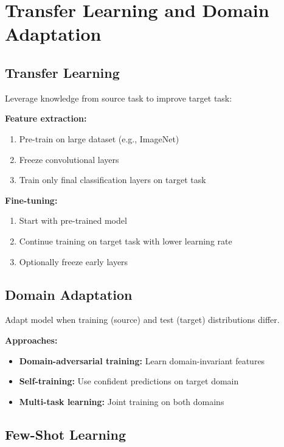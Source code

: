
\section{Transfer Learning and Domain Adaptation }
\label{sec:transfer-learning}

\subsection{Transfer Learning}

Leverage knowledge from source task to improve target task:

\textbf{Feature extraction:}
\begin{enumerate}
    \item Pre-train on large dataset (e.g., ImageNet)
    \item Freeze convolutional layers
    \item Train only final classification layers on target task
\end{enumerate}

\textbf{Fine-tuning:}
\begin{enumerate}
    \item Start with pre-trained model
    \item Continue training on target task with lower learning rate
    \item Optionally freeze early layers
\end{enumerate}

\subsection{Domain Adaptation}

Adapt model when training (source) and test (target) distributions differ.

\textbf{Approaches:}
\begin{itemize}
    \item \textbf{Domain-adversarial training:} Learn domain-invariant features
    \item \textbf{Self-training:} Use confident predictions on target domain
    \item \textbf{Multi-task learning:} Joint training on both domains
\end{itemize}

\subsection{Few-Shot Learning}

